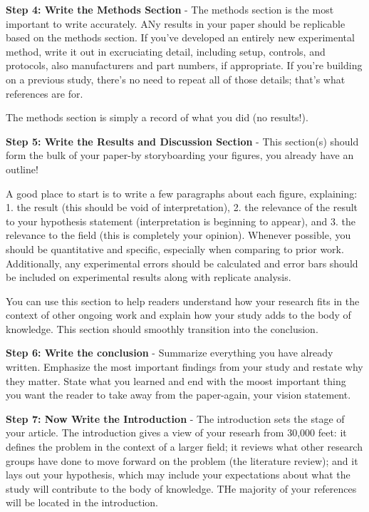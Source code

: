 \textbf{Step 4: Write the Methods Section} - The methods section is the most important to write accurately. ANy results in your paper should be replicable based on the methods section. If you've developed an entirely new experimental method, write it out in excruciating detail, including setup, controls, and protocols, also manufacturers and part numbers, if appropriate. If you're building on a previous study, there's no need to repeat all of those details; that's what references are for.

The methods section is simply a record of what you did (no results!). 


\textbf{Step 5: Write the Results and Discussion Section} - This section(s) should form the bulk of your paper-by storyboarding your figures, you already have an outline! 

A good place to start is to write a few paragraphs about each figure, explaining: 1. the result (this should be void of interpretation), 2. the relevance of the result to your hypothesis statement (interpretation is beginning to appear), and 3. the relevance to the field (this is completely your opinion). Whenever possible, you should be quantitative and specific, especially when comparing to prior work. Additionally, any experimental errors should be calculated and error bars should be included on experimental results along with replicate analysis.

You can use this section to help readers understand how your research fits in the context of other ongoing work and explain how your study adds to the body of knowledge. This section should smoothly transition into the conclusion.


\textbf{Step 6: Write the conclusion} - Summarize everything you have already written. Emphasize the most important findings from your study and restate why they matter. State what you learned and end with the moost important thing you want the reader to take away from the paper-again, your vision statement. 


\textbf{Step 7: Now Write the Introduction} - The introduction sets the stage of your article. The introduction gives a view of your researh from 30,000 feet: it defines the problem in the context of a larger field; it reviews what other research groups have done to move forward on the problem (the literature review); and it lays out your hypothesis, which may include your expectations about what the study will contribute to the body of knowledge. THe majority of your references will be located in the introduction.


